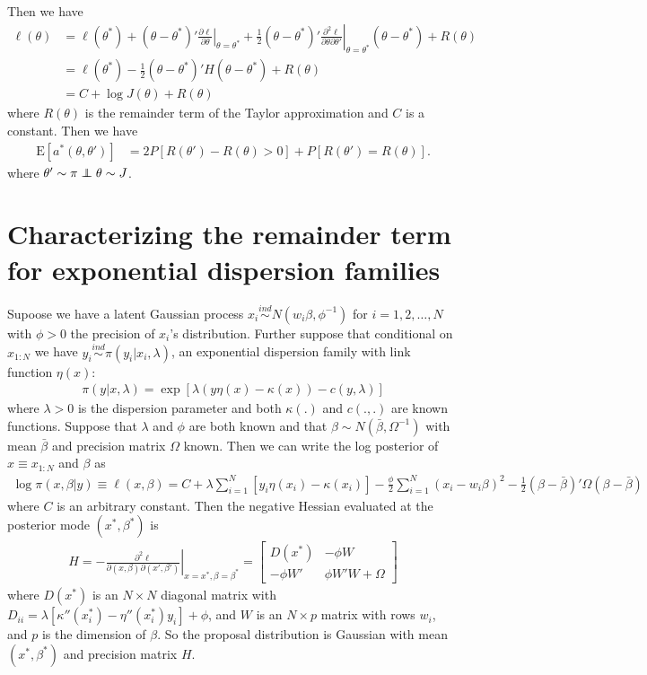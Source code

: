 \documentclass{article}
\newcommand\independent{\protect\mathpalette{\protect\independenT}{\perp}}
\def\independenT#1#2{\mathrel{\rlap{$#1#2$}\mkern2mu{#1#2}}}
\newcommand\E{\mathrm{E}}
\begin{document}
Then we have
\begin{align*}
\ell(\theta) &= \ell(\theta^*) + (\theta - \theta^*)'\left.\frac{\partial \ell}{\partial \theta}\right|_{\theta = \theta^*} + \frac{1}{2}(\theta - \theta^*)'\left.\frac{\partial^2 \ell}{\partial \theta\partial \theta'}\right|_{\theta = \theta^*}(\theta - \theta^*) + R(\theta)\\
&= \ell(\theta^*) - \frac{1}{2}(\theta - \theta^*)'H(\theta - \theta^*) + R(\theta)\\
&= C + \log J(\theta) + R(\theta)
\end{align*}
where $R(\theta)$ is the remainder term of the Taylor approximation and $C$ is a constant. Then we have
\begin{align*}
\E[a^*(\theta,\theta')]&= 2P\left[R(\theta') - R(\theta) > 0\right] + P\left[R(\theta') = R(\theta)\right].
\end{align*}
where $\theta'\sim \pi \independent \theta \sim J$.

\section{Characterizing the remainder term for exponential dispersion families}
Supoose we have a latent Gaussian process $x_i \stackrel{ind}{\sim}N(w_i\beta,\phi^{-1})$ for $i=1,2,\dots,N$ with $\phi>0$ the precision of $x_i$'s distribution. Further suppose that conditional on $x_{1:N}$ we have $y_i\stackrel{ind}{\sim} \pi(y_i|x_i,\lambda)$, an exponential dispersion family with link function $\eta(x)$:
\begin{align*}
\pi(y|x,\lambda) = \exp\left[\lambda(y\eta(x) - \kappa(x)) - c(y,\lambda)\right]
\end{align*}
where $\lambda>0$ is the dispersion parameter and both $\kappa(.)$ and $c(.,.)$ are known functions. Suppose that $\lambda$ and $\phi$ are both known and that $\beta\sim N(\bar{\beta},\Omega^{-1})$ with mean $\bar{\beta}$ and precision matrix $\Omega$ known. Then we can write the log posterior of $x\equiv x_{1:N}$ and $\beta$ as
\begin{align*}
\log \pi(x,\beta|y) \equiv \ell(x,\beta) = C + \lambda\sum_{i=1}^N[y_i\eta(x_i) - \kappa(x_i)] - \frac{\phi}{2}\sum_{i=1}^N(x_i - w_i\beta)^2 - \frac{1}{2}(\beta - \bar{\beta})'\Omega(\beta - \bar{\beta})
\end{align*}
where $C$ is an arbitrary constant. Then the negative Hessian evaluated at the posterior mode $(x^*,\beta^*)$ is
\begin{align*}
H = -\left.\frac{\partial^2\ell}{\partial(x,\beta)\partial(x',\beta')}\right|_{x=x^*,\beta=\beta^*} = \begin{bmatrix} D(x^*) & -\phi W \\ -\phi W' & \phi W'W + \Omega \end{bmatrix}
\end{align*}
where $D(x^*)$ is an $N\times N$ diagonal matrix with $D_{ii} = \lambda[\kappa''(x_i^*) - \eta''(x_i^*)y_i] + \phi$, and $W$ is an $N\times p$ matrix with rows $w_i$, and $p$ is the dimension of $\beta$. So the proposal distribution is Gaussian with mean $(x^*,\beta^*)$ and precision matrix $H$.
\end{document}

